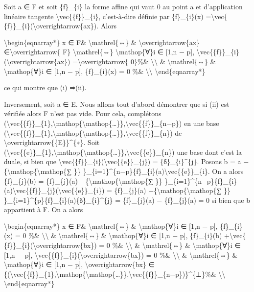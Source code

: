 \documentclass[]{article}
\begin{document}
Soit a ∈ F et soit \{f\}\_\{i\} la forme affine qui vaut 0 au point a et
d'application linéaire tangente \textbackslash{}vec\{\{f\}\}\_\{i\},
c'est-à-dire définie par \{f\}\_\{i\}(x) =\textbackslash{}vec\{
\{f\}\}\_\{i\}(\textbackslash{}overrightarrow\{ax\}). Alors

\textbackslash{}begin\{eqnarray*\} x ∈ F\& \textbackslash{}mathrel\{⇔\}
\& \textbackslash{}overrightarrow\{ax\}
∈\textbackslash{}overrightarrow\{ F\} \textbackslash{}mathrel\{⇔\}
\textbackslash{}mathop\{∀\}i ∈ {[}1,n − p{]},
\textbackslash{}vec\{\{f\}\}\_\{i\}(\textbackslash{}overrightarrow\{ax\})
=\textbackslash{}overrightarrow\{ 0\}\%\&
\textbackslash{}\textbackslash{} \& \textbackslash{}mathrel\{⇔\} \&
\textbackslash{}mathop\{∀\}i ∈ {[}1,n − p{]}, \{f\}\_\{i\}(x) = 0 \%\&
\textbackslash{}\textbackslash{} \textbackslash{}end\{eqnarray*\}

ce qui montre que (i) ⇒(ii).

Inversement, soit a ∈ E. Nous allons tout d'abord démontrer que si (ii)
est vérifiée alors F n'est pas vide. Pour cela, complétons
(\textbackslash{}vec\{\{f\}\}\_\{1\},\textbackslash{}mathop\{\textbackslash{}mathop\{\ldots{}\}\},\textbackslash{}vec\{\{f\}\}\_\{n−p\})
en une base
(\textbackslash{}vec\{\{f\}\}\_\{1\},\textbackslash{}mathop\{\textbackslash{}mathop\{\ldots{}\}\},\textbackslash{}vec\{\{f\}\}\_\{n\})
de \textbackslash{}overrightarrow\{\{E\}\}\^{}\{∗\}. Soit
(\textbackslash{}vec\{\{e\}\}\_\{1\},\textbackslash{}mathop\{\textbackslash{}mathop\{\ldots{}\}\},\textbackslash{}vec\{\{e\}\}\_\{n\})
une base dont c'est la duale, si bien que
\textbackslash{}vec\{\{f\}\}\_\{i\}(\textbackslash{}vec\{\{e\}\}\_\{j\})
= \{δ\}\_\{i\}\^{}\{j\}. Posons b = a
−\{\textbackslash{}mathop\{\textbackslash{}mathop\{∑ \}\}
\}\_\{i=1\}\^{}\{n−p\}\{f\}\_\{i\}(a)\textbackslash{}vec\{\{e\}\}\_\{i\}.
On a alors \{f\}\_\{j\}(b) = \{f\}\_\{j\}(a)
−\{\textbackslash{}mathop\{\textbackslash{}mathop\{∑ \}\}
\}\_\{i=1\}\^{}\{n−p\}\{f\}\_\{i\}(a)\textbackslash{}vec\{\{f\}\}\_\{j\}(\textbackslash{}vec\{\{e\}\}\_\{i\})
= \{f\}\_\{j\}(a) −\{\textbackslash{}mathop\{\textbackslash{}mathop\{∑
\}\} \}\_\{i=1\}\^{}\{p\}\{f\}\_\{i\}(a)\{δ\}\_\{i\}\^{}\{j\} =
\{f\}\_\{j\}(a) − \{f\}\_\{j\}(a) = 0 si bien que b appartient à F. On a
alors

\textbackslash{}begin\{eqnarray*\} x ∈ F\& \textbackslash{}mathrel\{⇔\}
\& \textbackslash{}mathop\{∀\}i ∈ {[}1,n − p{]}, \{f\}\_\{i\}(x) = 0
\%\& \textbackslash{}\textbackslash{} \& \textbackslash{}mathrel\{⇔\} \&
\textbackslash{}mathop\{∀\}i ∈ {[}1,n − p{]}, \{f\}\_\{i\}(b)
+\textbackslash{}vec\{
\{f\}\}\_\{i\}(\textbackslash{}overrightarrow\{bx\}) = 0 \%\&
\textbackslash{}\textbackslash{} \& \textbackslash{}mathrel\{⇔\} \&
\textbackslash{}mathop\{∀\}i ∈ {[}1,n − p{]},
\textbackslash{}vec\{\{f\}\}\_\{i\}(\textbackslash{}overrightarrow\{bx\})
= 0 \%\& \textbackslash{}\textbackslash{} \&
\textbackslash{}mathrel\{⇔\} \& \textbackslash{}mathop\{∀\}i ∈ {[}1,n −
p{]}, \textbackslash{}overrightarrow\{bx\} ∈
\{(\textbackslash{}vec\{\{f\}\}\_\{1\},\textbackslash{}mathop\{\textbackslash{}mathop\{\ldots{}\}\},\textbackslash{}vec\{\{f\}\}\_\{n−p\})\}\^{}\{⊥\}\%\&
\textbackslash{}\textbackslash{} \textbackslash{}end\{eqnarray*\}
\end{document}

